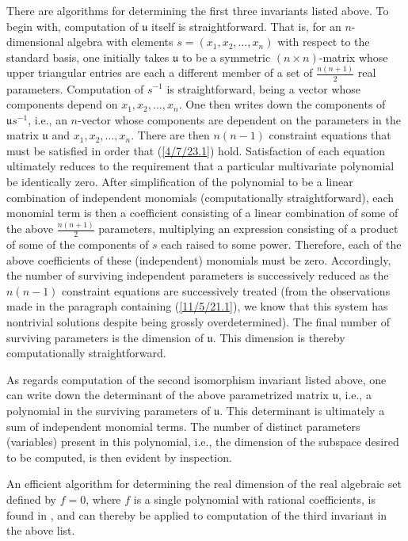 \documentclass{amsart}
\numberwithin{equation}{section}
\theoremstyle{definition}
\numberwithin{theorem}{section}
\begin{document}
There are algorithms for determining the first three invariants listed above.  To begin with, computation of $\mathfrak{u}$ itself is straightforward.  That is, for an $n$-dimensional algebra with elements $s = (x_1,x_2,\dots,x_n)$ with respect to the standard basis, one initially takes $\mathfrak{u}$ to be a symmetric $(n\times n)$-matrix  whose upper triangular entries are each a different member of a set of $\frac{n(n+1)}{2}$ real parameters.  Computation of $s^{-1}$ is straightforward, being a vector whose components depend on $x_1,x_2,\dots,x_n$.  One then writes down the components of $\mathfrak{u}s^{-1}$, i.e., an $n$-vector whose components are dependent on the parameters in the matrix $\mathfrak{u}$ and $x_1,x_2,\dots,x_n$.  There are then $n(n-1)$ constraint equations that must be satisfied in order that (\ref{4/7/23.1}) hold.  Satisfaction of each equation ultimately reduces to the requirement that a particular multivariate polynomial be identically zero.  After simplification of the polynomial to be a linear combination of independent monomials (computationally straightforward), each monomial term is then a coefficient consisting of a linear combination of some of the above $\frac{n(n+1)}{2}$ parameters, multiplying an expression consisting of a product of some of the components of $s$ each raised to some power.  Therefore, each of the above coefficients of these (independent) monomials must be zero.  Accordingly, the number of surviving independent parameters is successively reduced as the $n(n-1)$ constraint equations are successively treated  (from the observations made in the paragraph containing (\ref{11/5/21.1}), we know that this system has nontrivial solutions despite being grossly overdetermined).   The final number of surviving parameters is the dimension of $\mathfrak{u}$.  This dimension is thereby computationally straightforward.

As regards computation of the second isomorphism invariant listed above, one can write down the determinant of the above parametrized matrix $\mathfrak{u}$, i.e., a polynomial in the surviving parameters of $\mathfrak{u}$.  This determinant is ultimately a sum of independent monomial terms.  The number of distinct parameters (variables) present in this polynomial, i.e., the dimension of the subspace desired to be computed, is then evident by inspection.

An efficient algorithm for determining the real dimension of the real algebraic set defined by $f=0$, where $f$ is a single polynomial with rational coefficients, is found in \cite{bannwarth:2015}, and can thereby be applied to computation of the third invariant in the above list. 
\end{document}
